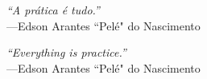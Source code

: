 \chapter*{}
\vspace*{\fill}

\hfill
\textit{``A pr{\'a}tica {\'e} tudo.''} \\
\vspace{.2em}
\hfill
---Edson Arantes ``Pel{\'e}" do Nascimento
\vspace{1em}

\pagebreak[4]
\vspace*{\fill}

\textit{``Everything is practice.''} \\
\vspace{.2em}
---Edson Arantes ``Pel{\'e}" do Nascimento
\vspace{1em}
